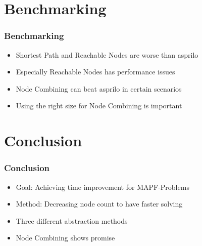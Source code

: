\documentclass{beamer}
\begin{document}
\section{Benchmarking}
\begin{frame}
\frametitle{Benchmarking}
\begin{itemize}
\item<2-> Shortest Path and Reachable Nodes are worse than asprilo
\medskip
\item<3-> Especially Reachable Nodes has performance issues
\medskip
\item<4-> Node Combining can beat asprilo in certain scenarios
\medskip
\item<5-> Using the right size for Node Combining is important
\end{itemize}
\end{frame}

\section{Conclusion}
\begin{frame}
\frametitle{Conclusion}
\begin{itemize}
\item<2-> Goal: Achieving time improvement for MAPF-Problems
\medskip
\item<3-> Method: Decreasing node count to have faster solving
\medskip
\item<4-> Three different abstraction methods
\medskip
\item<5-> Node Combining shows promise
\end{itemize}
\end{frame}
\end{document}
